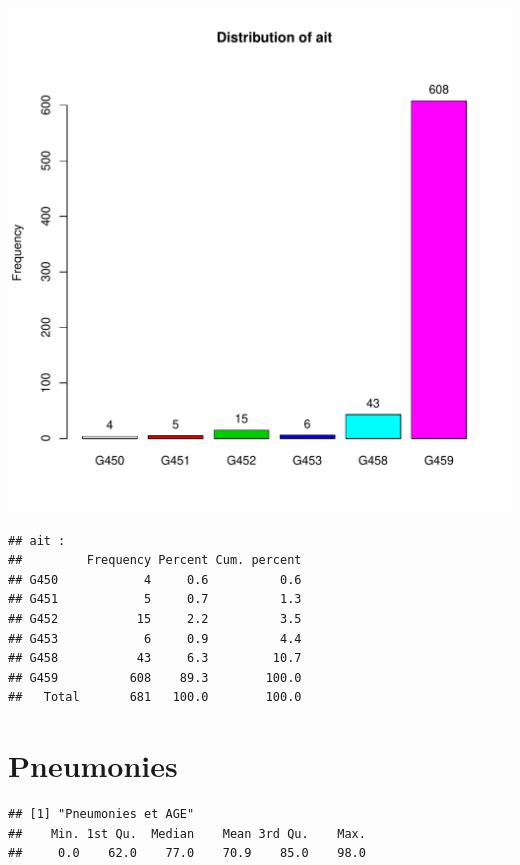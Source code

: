 \documentclass[12pt,english,french,twoside]{report}\usepackage[]{graphicx}\usepackage[]{color}
\makeatletter
\def\maxwidth{ %
  \ifdim\Gin@nat@width>\linewidth
    \linewidth
  \else
    \Gin@nat@width
  \fi
}
\newenvironment{kframe}{%
 \def\at@end@of@kframe{}%
 \ifinner\ifhmode%
  \def\at@end@of@kframe{\end{minipage}}%
  \begin{minipage}{\columnwidth}%
 \fi\fi%
 \def\FrameCommand##1{\hskip\@totalleftmargin \hskip-\fboxsep
 \colorbox{shadecolor}{##1}\hskip-\fboxsep
     \hskip-\linewidth \hskip-\@totalleftmargin \hskip\columnwidth}%
 \MakeFramed {\advance\hsize-\width
   \@totalleftmargin\z@ \linewidth\hsize
   \@setminipage}}%
 {\par\unskip\endMakeFramed%
 \at@end@of@kframe}
\newenvironment{knitrout}{}{} %
\makeatother
\begin{document}
\begin{knitrout}
\color{fgcolor}
\includegraphics[width=\maxwidth]{figure/ait} 
\begin{kframe}\begin{verbatim}
## ait :  
##         Frequency Percent Cum. percent
## G450            4     0.6          0.6
## G451            5     0.7          1.3
## G452           15     2.2          3.5
## G453            6     0.9          4.4
## G458           43     6.3         10.7
## G459          608    89.3        100.0
##   Total       681   100.0        100.0
\end{verbatim}
\end{kframe}
\end{knitrout}


\section{Pneumonies}

\begin{knitrout}
\color{fgcolor}\begin{kframe}


{\ttfamily\noindent\color{warningcolor}{\#\# Warning: impossible d'ouvrir le fichier '../mes\_fonctions.R' : Aucun fichier ou dossier de ce type}}

{\ttfamily\noindent\bfseries\color{errorcolor}{\#\# Error: impossible d'ouvrir la connexion}}\begin{verbatim}
## [1] "Pneumonies et AGE"
##    Min. 1st Qu.  Median    Mean 3rd Qu.    Max. 
##     0.0    62.0    77.0    70.9    85.0    98.0
\end{verbatim}
\end{kframe}
\end{knitrout}
\end{document}
